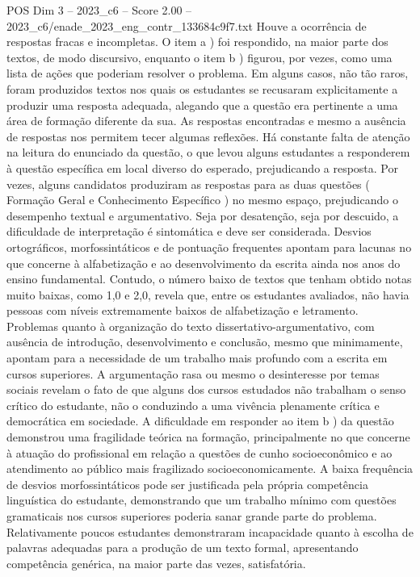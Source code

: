 \begin{textsample}{POS Dim 3 – 2023\_c6 – Score 2.00 – 2023\_c6/enade\_2023\_eng\_contr\_133684c9f7.txt}
Houve a ocorrência de respostas fracas e incompletas.
O item a ) foi respondido, na maior parte dos textos, de modo discursivo, enquanto o item b ) figurou, por vezes, como uma lista de ações que poderiam resolver o problema.
Em alguns casos, não tão raros, foram produzidos textos nos quais os estudantes se recusaram explicitamente a produzir uma resposta adequada, alegando que a questão era pertinente a uma área de formação diferente da sua.
As respostas encontradas e mesmo a ausência de respostas nos permitem tecer algumas reflexões.
Há constante falta de atenção na leitura do enunciado da questão, o que levou alguns estudantes a responderem à questão específica em local diverso do esperado, prejudicando a resposta.
Por vezes, alguns candidatos produziram as respostas para as duas questões ( Formação Geral e Conhecimento Específico ) no mesmo espaço, prejudicando o desempenho textual e argumentativo.
Seja por desatenção, seja por descuido, a dificuldade de interpretação é sintomática e deve ser considerada.
Desvios ortográficos, morfossintáticos e de pontuação frequentes apontam para lacunas no que concerne à alfabetização e ao desenvolvimento da escrita ainda nos anos do ensino fundamental.
Contudo, o número baixo de textos que tenham obtido notas muito baixas, como 1,0 e 2,0, revela que, entre os estudantes avaliados, não havia pessoas com níveis extremamente baixos de alfabetização e letramento.
Problemas quanto à organização do texto dissertativo-argumentativo, com ausência de introdução, desenvolvimento e conclusão, mesmo que minimamente, apontam para a necessidade de um trabalho mais profundo com a escrita em cursos superiores.
A argumentação rasa ou mesmo o desinteresse por temas sociais revelam o fato de que alguns dos cursos estudados não trabalham o senso crítico do estudante, não o conduzindo a uma vivência plenamente crítica e democrática em sociedade.
A dificuldade em responder ao item b ) da questão demonstrou uma fragilidade teórica na formação, principalmente no que concerne à atuação do profissional em relação a questões de cunho socioeconômico e ao atendimento ao público mais fragilizado socioeconomicamente.
A baixa frequência de desvios morfossintáticos pode ser justificada pela própria competência linguística do estudante, demonstrando que um trabalho mínimo com questões gramaticais nos cursos superiores poderia sanar grande parte do problema.
Relativamente poucos estudantes demonstraram incapacidade quanto à escolha de palavras adequadas para a produção de um texto formal, apresentando competência genérica, na maior parte das vezes, satisfatória.

\end{textsample}
